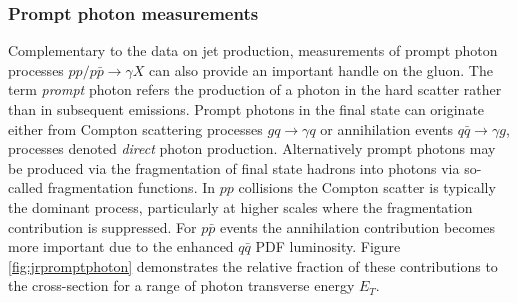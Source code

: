 \subsubsection{Prompt photon measurements}
Complementary to the data on jet production, measurements of prompt photon processes $pp/p\bar{p} \to \gamma X$ can also provide an important handle on the gluon. The term \emph{prompt} photon refers the production of a photon in the hard scatter rather than in subsequent emissions. Prompt photons in the final state can originate either from Compton scattering processes $gq \to \gamma q$ or annihilation events $q\bar{q} \to \gamma g$, processes denoted \emph{direct} photon production. Alternatively prompt photons may be produced via the fragmentation of final state hadrons into photons via so-called fragmentation functions\cite{Bourhis:1997yu,Gluck:1992zx}. In $pp$ collisions the Compton scatter is typically the dominant process, particularly at higher scales where the fragmentation contribution is suppressed. For $p\bar{p}$ events the annihilation contribution becomes more important due to the enhanced $q\bar{q}$ PDF luminosity. Figure \ref{fig:jrpromptphoton} demonstrates the relative fraction of these contributions to the cross-section for a range of photon transverse energy $E_T$.
